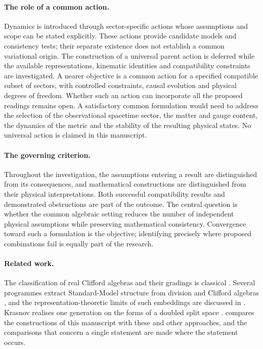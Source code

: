 \paragraph{The role of a common action.} Dynamics is introduced through sector-specific actions whose assumptions and scope can be stated
explicitly. These actions provide candidate models and consistency tests; their separate existence does not establish a common variational
origin. The construction of a universal parent action is deferred while the available representations, kinematic identities and
compatibility constraints are investigated. A nearer objective is a common action for a specified compatible subset of sectors, with
controlled constraints, causal evolution and physical degrees of freedom. Whether such an action can incorporate all the proposed readings
remains open. A satisfactory common formulation would need to address the selection of the observational spacetime sector, the matter and
gauge content, the dynamics of the metric and the stability of the resulting physical states. No universal action is claimed in this
manuscript.

\paragraph{The governing criterion.} Throughout the investigation, the assumptions entering a result are distinguished from its
consequences, and mathematical constructions are distinguished from their physical interpretations. Both successful compatibility results
and demonstrated obstructions are part of the outcome. The central question is whether the common algebraic setting reduces the number of
independent physical assumptions while preserving mathematical consistency. Convergence toward such a formulation is the objective;
identifying precisely where proposed combinations fail is equally part of the research.

\paragraph{Related work.} The classification of real Clifford algebras and their gradings is classical
\cite{LawsonMichelsohn,Lounesto,Porteous,MosnaMirallesVaz}. Several programmes extract Standard-Model structure from division and Clifford
algebras \cite{Furey,Gresnigt,ChamseddineConnes}, and the representation-theoretic limits of such embeddings are discussed in
\cite{DistlerGaribaldi}. Krasnov realises one generation on the forms of a doubled split space \cite{Krasnov18}. 
compares the constructions of this manuscript with these and other approaches, and the comparisons that concern a single statement are made
where the statement occurs.

